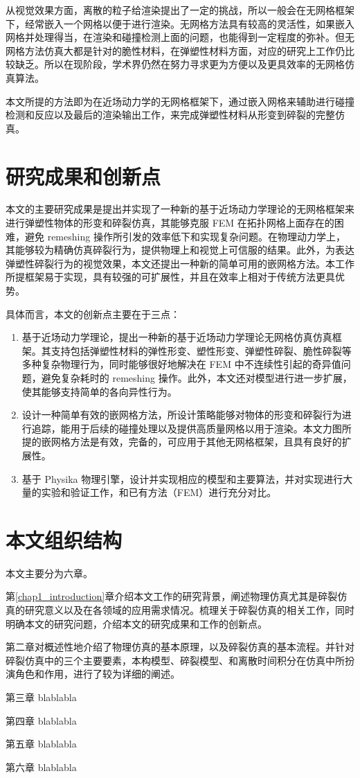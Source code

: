 从视觉效果方面，离散的粒子给渲染提出了一定的挑战，所以一般会在无网格框架下，经常嵌入一个网格以便于进行渲染。无网格方法具有较高的灵活性，如果嵌入网格并处理得当，在渲染和碰撞检测上面的问题，也能得到一定程度的弥补。但无网格方法仿真大都是针对的脆性材料，在弹塑性材料方面，对应的研究上工作仍比较缺乏。所以在现阶段，学术界仍然在努力寻求更为方便以及更具效率的无网格仿真算法。

本文所提的方法即为在近场动力学的无网格框架下，通过嵌入网格来辅助进行碰撞检测和反应以及最后的渲染输出工作，来完成弹塑性材料从形变到碎裂的完整仿真。

\section{研究成果和创新点}
本文的主要研究成果是提出并实现了一种新的基于近场动力学理论的无网格框架来进行弹塑性物体的形变和碎裂仿真，其能够克服 FEM 在拓扑网格上面存在的困难，避免 remeshing 操作所引发的效率低下和实现复杂问题。在物理动力学上，其能够较为精确仿真碎裂行为，提供物理上和视觉上可信服的结果。此外，为表达弹塑性碎裂行为的视觉效果，本文还提出一种新的简单可用的嵌网格方法。本工作所提框架易于实现，具有较强的可扩展性，并且在效率上相对于传统方法更具优势。

具体而言，本文的创新点主要在于三点：
\begin{enumerate}
  \item 基于近场动力学理论，提出一种新的基于近场动力学理论无网格仿真仿真框架。其支持包括弹塑性材料的弹性形变、塑性形变、弹塑性碎裂、脆性碎裂等多种复杂物理行为，同时能够很好地解决在 FEM 中不连续性引起的奇异值问题，避免复杂耗时的 remeshing 操作。此外，本文还对模型进行进一步扩展，使其能够支持简单的各向异性行为。
  \item 设计一种简单有效的嵌网格方法，所设计策略能够对物体的形变和碎裂行为进行追踪，能用于后续的碰撞处理以及提供高质量网格以用于渲染。本文力图所提的嵌网格方法是有效，完备的，可应用于其他无网格框架，且具有良好的扩展性。
  \item 基于 Physika 物理引擎，设计并实现相应的模型和主要算法，并对实现进行大量的实验和验证工作，和已有方法（FEM）进行充分对比。
\end{enumerate}

\section{本文组织结构}
本文主要分为六章。

第\ref{chap1_introduction}章介绍本文工作的研究背景，阐述物理仿真尤其是碎裂仿真的研究意义以及在各领域的应用需求情况。梳理关于碎裂仿真的相关工作，同时明确本文的研究问题，介绍本文的研究成果和工作的创新点。

第二章对概述性地介绍了物理仿真的基本原理，以及碎裂仿真的基本流程。并针对碎裂仿真中的三个主要要素，本构模型、碎裂模型、和离散时间积分在仿真中所扮演角色和作用，进行了较为详细的阐述。

第三章 blablabla

第四章 blablabla

第五章 blablabla

第六章 blablabla